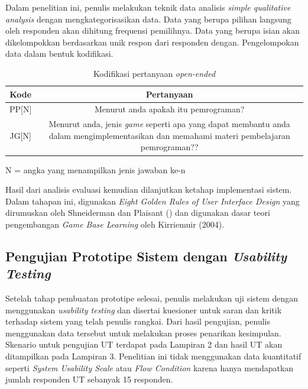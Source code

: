 	Dalam penelitian ini, penulis melakukan teknik data analisis \textit{simple qualitative analysis} dengan mengkategorisasikan data. Data yang berupa pilihan langsung oleh responden akan dihitung frequensi pemilihnya. Data yang berupa isian akan dikelompokkan berdasarkan unik respon dari responden dengan. Pengelompokan data dalam bentuk kodifikasi.
	\begin{table}
		\centering
		\caption{Kodifikasi pertanyaan \textit{open-ended}}
		\label{tab:tab1}
		\begin{tabular}{| c | c |}
			\hline
			Kode & Pertanyaan \\
			\hline
			PP[N] & \multicolumn{1}{p{10cm}|}{Menurut anda apakah itu pemrograman?}\\ \hline
			JG[N] & \multicolumn{1}{p{10cm}|}{Menurut anda, jenis \textit{game} seperti apa yang dapat membantu anda dalam mengimplementasikan dan memahami materi pembelajaran pemrograman??} \\ \hline
		\end{tabular}
		\vspace{1ex}
		
		\raggedright \small{N = angka yang menampilkan jenis jawaban ke-n}
	\end{table}
	Hasil dari analisis evaluasi kemudian dilanjutkan ketahap implementasi sistem. Dalam tahapan ini, digunakan \textit{Eight Golden Rules of User Interface Design} yang dirumuskan oleh Shneiderman dan Plaisant (\citeyear{papper.shneiderman}) dan digunakan dasar teori pengembangan \textit{Game Base Learning} oleh Kirriemuir (2004).
	
	\subsection{Pengujian Prototipe Sistem dengan \textit{Usability Testing}}
	
	Setelah tahap pembuatan prototipe selesai, penulis melakukan uji sistem dengan menggunakan \textit{usability testing} dan disertai kuesioner untuk saran dan kritik terhadap sistem yang telah penulis rangkai. Dari hasil pengujian, penulis menggunakan data tersebut untuk melakukan proses penarikan kesimpulan. Skenario untuk pengujian UT terdapat pada Lampiran 2 dan hasil UT akan ditampilkan pada Lampiran 3. Penelitian ini tidak menggunakan data kuantitatif seperti \textit{System Usability Scale} atau \textit{Flow Condition} karena hanya mendapatkan jumlah responden UT sebanyak 15 responden.
	
